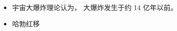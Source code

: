 
\begin{issues}
\issueDraft
\end{issues}

\begin{itemize}
\item 宇宙大爆炸理论认为， 大爆炸发生于约 14 亿年以前。
\item 哈勃红移
\end{itemize}
